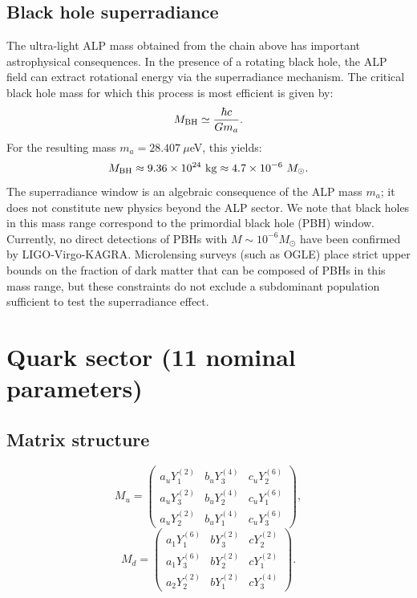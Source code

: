 \documentclass[12pt,a4paper]{article}
\numberwithin{equation}{section}
\begin{document}
\subsection{Black hole superradiance}
\label{sec:bh}
The ultra-light ALP mass obtained from the chain above has important astrophysical consequences. In the presence of a rotating black hole, the ALP field can extract rotational energy via the superradiance mechanism. The critical black hole mass for which this process is most efficient is given by:
\begin{equation}
M_{\rm BH} \simeq \frac{\hbar c}{G m_a}.
\end{equation}
For the resulting mass \(m_a = 28.407~\mu\)eV, this yields:
\begin{equation}
M_{\rm BH} \approx 9.36 \times 10^{24}~{\rm kg} \approx 4.7 \times 10^{-6}~M_\odot.
\end{equation}
The superradiance window is an algebraic consequence of the ALP mass \(m_a\); it does not constitute new physics beyond the ALP sector. We note that black holes in this mass range correspond to the primordial black hole (PBH) window. Currently, no direct detections of PBHs with \(M \sim 10^{-6} M_\odot\) have been confirmed by LIGO-Virgo-KAGRA. Microlensing surveys (such as OGLE) place strict upper bounds on the fraction of dark matter that can be composed of PBHs in this mass range, but these constraints do not exclude a subdominant population sufficient to test the superradiance effect.

\section{Quark sector (11 nominal parameters)}
\subsection{Matrix structure}
\begin{equation}
M_u = \begin{pmatrix}
a_u Y_1^{(2)} & b_u Y_3^{(4)} & c_u Y_2^{(6)} \\
a_u Y_3^{(2)} & b_u Y_2^{(4)} & c_u Y_1^{(6)} \\
a_u Y_2^{(2)} & b_u Y_1^{(4)} & c_u Y_3^{(6)}
\end{pmatrix},
\end{equation}
\begin{equation}
M_d = \begin{pmatrix}
a_1 Y_1^{(6)} & b Y_3^{(2)} & c Y_2^{(2)} \\
a_1 Y_3^{(6)} & b Y_2^{(2)} & c Y_1^{(2)} \\
a_2 Y_2^{(2)} & b Y_1^{(2)} & c Y_3^{(4)}
\end{pmatrix}.
\end{equation}
\end{document}
